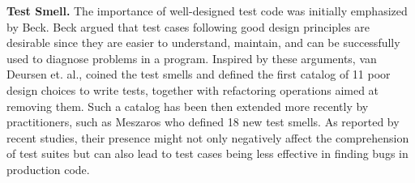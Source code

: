 \documentclass[conference]{IEEEtran}
\begin{document}






\textbf{Test Smell.} The importance of well-designed test code was initially emphasized by Beck\cite{b4}. Beck argued that test cases following good design principles are desirable since they are easier to understand, maintain, and can be successfully used to diagnose problems in a program. Inspired by these arguments, van Deursen et. al.,\cite{b7} coined the test smells and defined the first catalog of 11 poor design choices to write tests, together with refactoring operations aimed at removing them. Such a catalog has been then extended more recently by practitioners, such as Meszaros\cite{b6} who defined 18 new test smells. As reported by recent studies, their presence might not only negatively affect the comprehension of test suites but can also lead to test cases being less effective in finding bugs in production code\cite{b8}.
\end{document}
